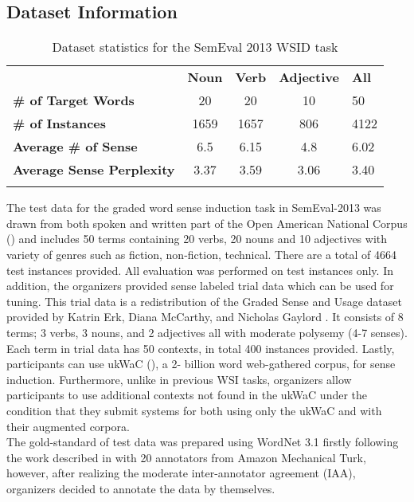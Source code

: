 
\subsection{Dataset Information} 


\begin{table}
\begin{center}
    \begin{tabular}{ l | c | c | c | l }  \Xhline{2\arrayrulewidth}  
     & \bf Noun & \bf Verb & \bf Adjective & \bf All \\  \Xhline{2\arrayrulewidth}  
    \bf \# of Target Words & 20 & 20 & 10 & 50 \\ 
    \bf \# of Instances & 1659 & 1657 & 806 & 4122 \\ 
    \bf Average \# of Sense & 6.5 & 6.15 & 4.8 & 6.02 \\ 
    \bf Average Sense Perplexity & 3.37 & 3.59 & 3.06 & 3.40 \\  \Xhline{2\arrayrulewidth}  
    \end{tabular}
\end{center}
    \caption{\label{table:semeval13-dataset} Dataset statistics for the SemEval 2013 WSID task}
\end{table}

The test data for the graded word sense induction task in SemEval-2013 was drawn from both spoken and written part of the Open American National Corpus (\cite{ide2004openamerican}) and includes 50 terms containing 20 verbs, 20 nouns and 10 adjectives with variety of genres such as fiction, non-fiction, technical. There are a total of 4664 test instances provided. All evaluation was performed on test instances only. In addition, the organizers provided sense labeled trial data which can be used for tuning. This trial data is a redistribution of the Graded Sense and Usage dataset provided by Katrin Erk, Diana McCarthy, and Nicholas Gaylord \cite{erk09graded}. It consists of 8 terms; 3 verbs, 3 nouns, and 2 adjectives all with moderate polysemy (4-7 senses). Each term in trial data has 50 contexts, in total 400 instances provided. Lastly, participants can use ukWaC (\cite{ukWaC}), a 2- billion word web-gathered corpus, for sense induction. Furthermore, unlike in previous WSI tasks, organizers allow participants to use additional contexts not found in the ukWaC under the condition that they submit systems for both using only the ukWaC and with their augmented corpora. \\ 

The gold-standard of test data was prepared using WordNet 3.1 firstly following the work described in \cite{jurgens13embracing} with 20 annotators from Amazon Mechanical Turk, however, after realizing the moderate inter-annotator agreement (IAA), organizers decided to annotate the data by themselves. \\ 


